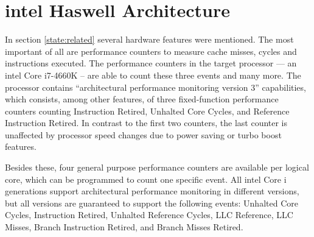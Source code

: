 \begin{comment}
\textbf{Fiasco.OC}
\begin{itemize}
  \item Kernel scheduler does no balancing, assigns thread to the first
    core specified in the affinity descriptor
  \item affinity descriptor: core(s) a thread should run on
  \item Syscall via run\_thread() to pass affinity descr to kernel scheduler
  \item interface to query execution time for each thread
  \item capability system -- to derive communication relationships from
  \item	Kernel feature wishes derived from related work: Performance counters
    and per thread accounting
\end{itemize}

\textbf{L4Re}
\begin{itemize}
  \item provides scheduler proxy interface, including affinity descriptor,
    scheduling parameters
  \item syscall interface
\end{itemize}
\end{comment}



\section{\gls{intel} Haswell Architecture}
\label{state:haswell}

In section \ref{state:related} several hardware features were mentioned.
The most important of all are performance counters to measure cache misses, cycles and
instructions executed.
The performance counters in the target processor --- an \gls{intel} Core
i7-4660K -- are able to count these three events and many more.
The processor contains ``architectural performance monitoring version 3''
capabilities, which consists, among other features, of three fixed-function
performance counters counting Instruction Retired, Unhalted Core Cycles, and
Reference Instruction Retired.
In contrast to the first two counters, the last counter is unaffected by
processor speed changes due to power saving or turbo boost features.

Besides these, four general purpose performance counters are available per
logical core, which can be programmed to count one specific event.
All \gls{intel} Core i generations support architectural performance monitoring
in different versions, but all versions are guaranteed to support the following
events:
Unhalted Core Cycles, Instruction Retired, Unhalted Reference Cycles,
LLC Reference, LLC Misses, Branch Instruction Retired,
and Branch Misses Retired.

